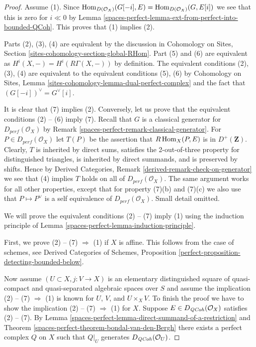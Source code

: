 \begin{proof}
Assume (1). Since
$\operatorname{Hom}_{D(\mathcal{O}_X)}(G[-i], E) = \operatorname{Hom}_{D(\mathcal{O}_X)}(G, E[i])$
we see that this is zero for $i \ll 0$ by
Lemma \ref{spaces-perfect-lemma-ext-from-perfect-into-bounded-QCoh}. This proves
that (1) implies (2).

\medskip\noindent
Parts (2), (3), (4) are equivalent by the discussion in
Cohomology on Sites, Section \ref{sites-cohomology-section-global-RHom}.
Part (5) and (6) are equivalent as $H^i(X, -) = H^i(R\Gamma(X, -))$
by definition. The equivalent conditions (2), (3), (4) are
equivalent to the equivalent conditions (5), (6) by
Cohomology on Sites, Lemma \ref{sites-cohomology-lemma-dual-perfect-complex}
and the fact that $(G[-i])^\vee = G^\vee[i]$.

\medskip\noindent
It is clear that (7) implies (2). Conversely,
let us prove that the equivalent conditions (2) -- (6) imply (7).
Recall that $G$ is a  classical generator for $D_{perf}(\mathcal{O}_X)$ by
Remark \ref{spaces-perfect-remark-classical-generator}.
For $P \in D_{perf}(\mathcal{O}_X)$ let $T(P)$ be the assertion that
$R\operatorname{Hom}_X(P, E)$ is in $D^+(\mathbf{Z})$.
Clearly, $T$ is inherited by direct sums,
satisfies the 2-out-of-three property for distinguished
triangles, is inherited by direct summands, and is preserved by shifts.
Hence by Derived Categories, Remark \ref{derived-remark-check-on-generator}
we see that (4) implies $T$ holds on all of $D_{perf}(\mathcal{O}_X)$.
The same argument works for all other properties, except that for property
(7)(b) and (7)(c) we also use that $P \mapsto P^\vee$ is a self
equivalence of $D_{perf}(\mathcal{O}_X)$. Small detail omitted.

\medskip\noindent
We will prove the equivalent conditions (2) -- (7) imply (1)
using the induction principle of
Lemma \ref{spaces-perfect-lemma-induction-principle}.

\medskip\noindent
First, we prove (2) -- (7) $\Rightarrow$ (1) if $X$ is affine.
This follows from the case of schemes, see
Derived Categories of Schemes, Proposition
\ref{perfect-proposition-detecting-bounded-below}.

\medskip\noindent
Now assume $(U \subset X, j : V \to X)$ is an elementary distinguished
square of quasi-compact and quasi-separated algebraic spaces over $S$
and assume the implication (2) -- (7) $\Rightarrow$ (1)
is known for $U$, $V$, and $U \times_X V$. To finish the proof
we have to show the implication (2) -- (7) $\Rightarrow$ (1) for $X$.
Suppose $E \in D_{\mathit{QCoh}}(\mathcal{O}_X)$ satisfies (2) -- (7).
By Lemma \ref{spaces-perfect-lemma-direct-summand-of-a-restriction} and
Theorem \ref{spaces-perfect-theorem-bondal-van-den-Bergh} there exists a perfect
complex $Q$ on $X$ such that $Q|_U$ generates $D_{\mathit{QCoh}} (\mathcal{O}_U)$.


\end{proof}
